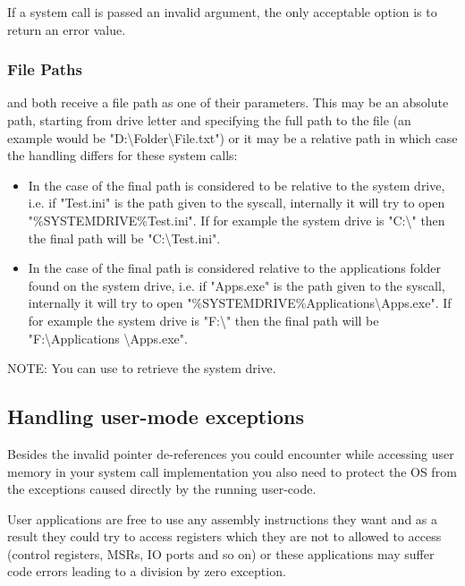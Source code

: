 If a system call is passed an invalid argument, the only acceptable option is to return an error
value.

\subsubsection{File Paths}

 and  both receive a file path as one of their
parameters. This may be an absolute path, starting from drive letter and specifying the full path
to the file (an example would be "D:\textbackslash Folder\textbackslash File.txt") or it may be a
relative path in which case the handling differs for these system calls:
\begin{itemize}
	\item In the case of  the final path is considered to be relative to the
system drive, i.e. if "Test.ini" is the path given to the syscall, internally it will try to open
"\%SYSTEMDRIVE\%Test.ini". If for example the system drive  is "C:\textbackslash" then the final path will be "C:\textbackslash Test.ini".

	\item In the case of  the final path is considered relative to the
applications folder found on the system drive, i.e. if "Apps.exe" is the path given to the syscall,
internally it will try to open "\%SYSTEMDRIVE\%Applications\textbackslash Apps.exe". If for example the system drive is "F:\textbackslash" then the final path will be "F:\textbackslash Applications \textbackslash Apps.exe".
\end{itemize}

NOTE: You can use  to retrieve the system drive.

\subsection{Handling user-mode exceptions}
\label{sect:UserExceptions}

Besides the invalid pointer de-references you could encounter while accessing user memory in your
system call implementation you also need to protect the OS from the exceptions caused directly by
the running user-code.

User applications are free to use any assembly instructions they want and as a result they could try
to access registers which they are not to allowed to access (control registers, MSRs, IO ports and
so on) or these applications may suffer code errors leading to a division by zero exception.

